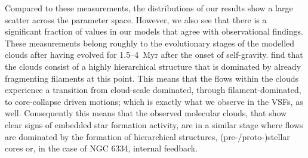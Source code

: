 Compared to these measurements, the distributions of our results show a large scatter across the parameter space. 
However, we also see that there is a significant fraction of values in our models that agree with observational findings. 
These measurements belong roughly to the evolutionary stages of the modelled clouds after having evolved for 1.5--4~Myr after the onset of self-gravity.
 find that the clouds consist of a highly hierarchical structure that is dominated by already fragmenting filaments at this point.
This means that the flows within the clouds experience a transition from cloud-scale dominated, through filament-dominated, to core-collapse driven motions; which is exactly what we observe in the VSFs, as well.
Consequently this means that the observed molecular clouds, that show clear signs of embedded star formation activity, are in a similar stage where flows are dominated by the formation of hierarchical structures, (pre-/proto-)stellar cores or, in the case of NGC 6334, internal feedback.


